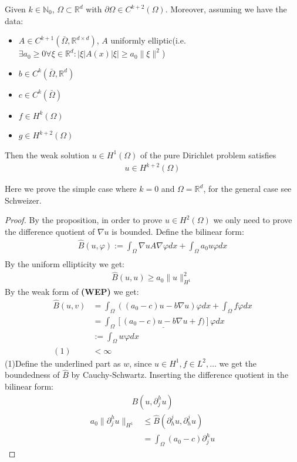 \begin{theorem}
 	Given $k \in \mathbb{N}_0$, $\Omega \subset \mathbb{R}^d$ with $\partial \Omega \in C^{k+2}(\Omega)$. Moreover, assuming we have the data:
 	\begin{itemize}
 		\item $A \in C^{k+1}(\bar{\Omega}, \mathbb{R}^{d \times d})$, $A$ uniformly elliptic(i.e. $\exists a_0 \geq 0 \forall \xi \in \mathbb{R}^d: |\xi| A(x) |\xi| \geq a_0 \|\xi\|^2$)
 		\item $b \in C^k(\bar{\Omega}, \mathbb{R}^d)$
 		\item $c \in C^k(\bar{\Omega})$
 		\item $f \in H^k(\Omega)$
 		\item $g \in H^{k+2}(\Omega)$
 	\end{itemize}
 	Then the weak solution $u \in H^1(\Omega)$ of the pure Dirichlet problem satisfies 
 	\begin{align*}
 		u \in H^{k+2}(\Omega)
 	\end{align*}
 \end{theorem}
\begin{remark}
Here we prove the simple case where $k = 0$ and $\Omega = \mathbb{R}^d$, for the general case see Schweizer.
\begin{proof}
 	By the proposition, in order to prove $u \in H^2(\Omega)$ we only need to prove the difference quotient of $\nabla u$ is bounded.
 	Define the bilinear form:
 	\begin{align*}
 		\hat{B}(u, \varphi) := \int_\Omega \nabla u A \nabla \varphi dx + \int_\Omega a_0 u \varphi dx\\
 	\end{align*}
 	By the uniform ellipticity we get:
 	\begin{align*}
 		\hat{B}(u, u) \geq a_0\|u\|_{H^1}^2
 	\end{align*}
	By the weak form of \textbf{(WEP)} we get:
 	\begin{align*}
 		\hat{B}(u, v) &= \int_\Omega ((a_0 - c)u - b\nabla u)\varphi dx     + \int_\Omega f \varphi dx\\
 		&= \int_\Omega \underline{ [(a_0 -c)u - b\nabla u + f)]}\varphi dx\\
 		&:= \int_\Omega w \varphi dx\\
 		(1)&< \infty
 	\end{align*}
 	(1)Define the underlined part as $w$, since $u \in H^1, f \in L^2, \dots$ we get the  boundedness of $\hat{B}$ by Cauchy-Schwartz.
 	Inserting the difference quotient in the bilinear form:
 \begin{align*}
 	B(u, \partial_j^h u)
 \end{align*}
\begin{align*}
	a_0\|\partial^h_j u \|_{H^1} &\leq \hat{B}(\partial_h^j u, \partial_h^j u)\\
	&= \int_\Omega (a_0 - c) \partial^h_j u 
\end{align*}
\end{proof}	
\end{remark}



